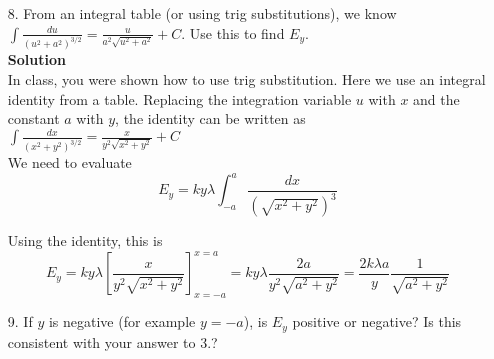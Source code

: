 \documentclass{article}
\begin{document}
%

\begin{enumerate}

  \item[8.] From an integral table (or using trig substitutions), we know $\displaystyle \int \frac{du}{(u^2+a^2)^{3/2}} = \frac{u}{a^2\sqrt{u^2+a^2}} + C$. Use this to find $E_y$.\\

            \textbf{Solution}\\

            In class, you were shown how to use trig substitution. Here we use an integral identity from a table. Replacing the integration variable $u$ with $x$ and the constant $a$ with $y$, the identity can be written as\\

            $\displaystyle \int \frac{dx}{(x^2+y^2)^{3/2}} = \frac{x}{y^2\sqrt{x^2+y^2}} + C$\\

            We need to evaluate\\

            \begin{equation}
              E_y = ky\lambda \int_{-a}^{a} \frac{dx}{(\sqrt{x^2+y^2})^3}
            \end{equation}

            Using the identity, this is\\

            \begin{equation}
              E_y = ky\lambda \left[\frac{x}{y^2\sqrt{x^2+y^2}}\right]_{x=-a}^{x=a}=ky\lambda \frac{2a}{y^2\sqrt{a^2+y^2}}=\frac{2k\lambda a}{y}\frac{1}{\sqrt{a^2+y^2}}
            \end{equation}

\end{enumerate}

\begin{enumerate}

  \item[9.] If $y$ is negative (for example $y=-a$), is $E_y$ positive or negative? Is this consistent with your answer to 3.?

\end{enumerate}

%
\end{document}

